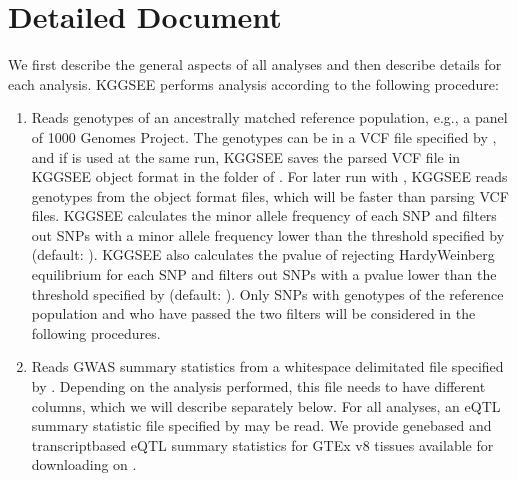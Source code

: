 \documentclass[letterpaper,10pt,english,openany,oneside]{sphinxmanual}
\begin{document}
\sphinxstepscope


\chapter{Detailed Document}
\label{\detokenize{detailed_document:detailed-document}}\label{\detokenize{detailed_document:id1}}\label{\detokenize{detailed_document::doc}}
\sphinxAtStartPar
We first describe the general aspects of all analyses and then describe details for each analysis. KGGSEE performs analysis according to the following procedure:
\begin{enumerate}
%
\item {} 
\sphinxAtStartPar
Reads genotypes of an ancestrally matched reference population, e.g., a panel of 1000 Genomes Project. The genotypes can be in a VCF file specified by , and if  is used at the same run, KGGSEE  saves the parsed VCF file in KGGSEE object format in the folder of . For later run with , KGGSEE reads genotypes from the object format files, which will be faster than parsing VCF files. KGGSEE calculates the minor allele frequency of each SNP and filters out SNPs with a minor allele frequency lower than the threshold specified by  (default: ). KGGSEE also calculates the p\sphinxhyphen{}value of rejecting Hardy\sphinxhyphen{}Weinberg equilibrium for each SNP and filters out SNPs with a p\sphinxhyphen{}value lower than the threshold specified by  (default: ). Only SNPs with genotypes of the reference population and who have passed the two filters will be considered in the following procedures.

\item {} 
\sphinxAtStartPar
Reads GWAS summary statistics from a whitespace delimitated file specified by . Depending on the analysis performed, this file needs to have different columns, which we will describe separately below. For all analyses, an eQTL summary statistic file specified by  may be read. We provide gene\sphinxhyphen{}based and transcript\sphinxhyphen{}based eQTL summary statistics for GTEx v8 tissues available for downloading on .


\end{enumerate}
\end{document}
